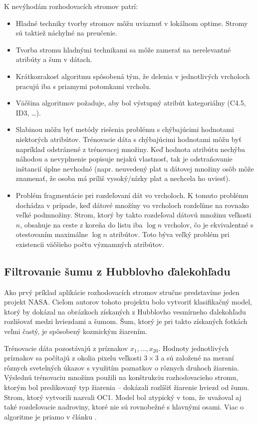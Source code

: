 K nevýhodám rozhodovacích stromov patrí:
\begin{itemize}
\item Hladné techniky tvorby stromov môžu uviaznuť v lokálnom optime. Stromy sú taktiež náchylné na preučenie.
\item Tvorba stromu hladnými technikami sa môže zamerať na nerelevantné atribúty a šum v dátach.
\item Krátkozrakosť algoritmu spôsobená tým, že delenia v jednotlivých vrcholoch pracujú iba s priamymi potomkami vrcholu.
\item Väčšina algoritmov požaduje, aby bol výstupný atribút kategoriálny (C4.5, ID3, \ldots).
\item Slabinou môžu byť metódy riešenia problému s chýbajúcimi hodnotami niektorých atribútov. Trénovacie dáta s chýbajúcimi hodnotami môžu byť napríklad odstránené z trénovacej množiny. Keď hodnota atribútu nechýba náhodou a nevyplnenie popisuje nejakú vlastnosť, tak je odstraňovanie inštancií úplne nevhodné (napr. neuvedený plat u dátovej množiny osôb môže znamenať, že osoba má príliš vysoký/nízky plat a nechcela ho uviesť).
\item Problém fragmentácie pri rozdeľovaní dát vo vrcholoch. K tomuto problému dochádza v prípade, keď dátové množíny vo vrcholoch rozdelíme na rovnako veľké podmnožiny. Strom, ktorý by takto rozdeľoval dátovú množinu veľkosti $n$, obsahuje na ceste z koreňa do listu iba $\log n$ vrcholov, čo je ekvivalentné s otestovaním maximálne $\log n$ atribútov. Toto býva veľký problém pri existencii väčšieho počtu významných atribútov.
\end{itemize}

\subsection{Filtrovanie šumu z Hubblovho ďalekohľadu}\label{kap1:2.8:2.8.2:Hubble}
Ako prvý príklad aplikácie rozhodovacích stromov stručne predstavíme jeden projekt NASA. Cieľom autorov tohoto projektu \cite{online-astronomy} bolo vytvoriť klasifikačný model, ktorý by dokázal na obrázkoch získaných z Hubblovho vesmírneho ďalekohľadu rozlišovať medzi hviezdami a šumom. Šum, ktorý je pri takto získaných fotkách veľmi častý, je spôsobený kozmickým žiarením. 

Trénovacie dáta pozostávajú z príznakov $x_{1},\ldots,x_{20}$. Hodnoty jednotlivých príznakov sa počítajú z okolia pixelu veľkosti $3 \times 3$ a sú založené na meraní rôznych svetelných úkazov s využitím poznatkov o rôznych druhoch žiarenia. Výslednú trénovaciu množinu použili na konštrukciu rozhodovacieho stromu, ktorým bol predikovaný typ žiarenia -- dokázali rozlíšiť žiarenie hviezd od šumu. Strom, ktorý vytvorili nazvali OC1. Model bol atypický v tom, že uvažoval aj také rozdeľovacie nadroviny, ktoré nie sú rovnobežné s hlavnými osami. Viac o algoritme je priamo v článku \cite[str. 281]{online-astronomy}.

